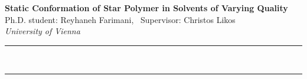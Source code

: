 \documentclass[a4paper,12pt]{article}
\renewenvironment{abstract}
 {\par\noindent\textbf{\abstractname}\ \ignorespaces \\}
 {\par\noindent\medskip}
\begin{document}
\pagestyle{fancy}
\thispagestyle{empty}
\renewcommand*{\thefootnote}{\fnsymbol{footnote}}
\begin{center}
\Large{\textbf{Static Conformation of Star Polymer in Solvents of Varying Quality}}
\vspace{0.4cm}
\normalsize
\\ Ph.D. student: Reyhaneh Farimani, \ Supervisor: Christos Likos \\
\vspace{0.1cm}
\textit{University of Vienna}
\medskip
\normalsize
\end{center}
{\color{gray}\hrule}
\vspace{0.4cm}
\begin{abstract}

\end{abstract}
{\color{gray}\hrule}
\medskip







\end{document}
